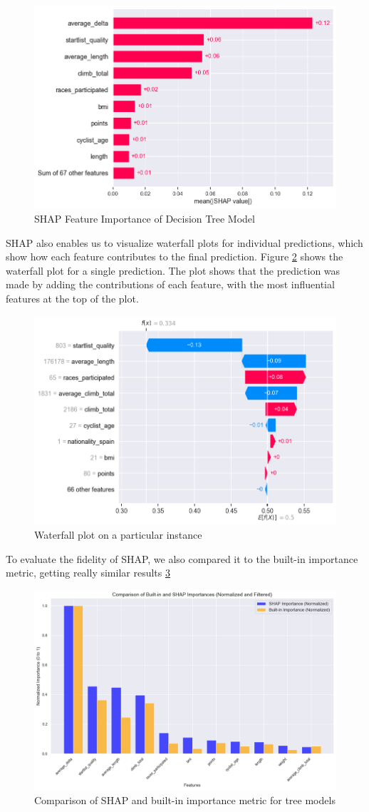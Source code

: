 \documentclass{article}
\begin{document}
\begin{figure}[H]
    \centering
    \includegraphics[width=0.75\linewidth]{shapdt.png}
    \caption{SHAP Feature Importance of Decision Tree Model}
    \label{fig:shapdt}
\end{figure}

SHAP also enables us to visualize waterfall plots for individual predictions, which show how each feature contributes to the final prediction. Figure \ref{fig:shapwaterfalldt} shows the waterfall plot for a single prediction. The plot shows that the prediction was made by adding the contributions of each feature, with the most influential features at the top of the plot.



\begin{figure}[H]
    \centering
    \includegraphics[width=0.5\linewidth]{image.png}
    \caption{Waterfall plot on a particular instance}
    \label{fig:shapwaterfalldt}
\end{figure}


To evaluate the fidelity of SHAP, we also compared it to the built-in importance metric, getting really similar results \ref{fig:compshap}

\begin{figure}[H]
    \centering
    \includegraphics[width=0.75\linewidth]{compshap.png}
    \caption{Comparison of SHAP and built-in importance metric for tree models}
    \label{fig:compshap}
\end{figure}
\end{document}
